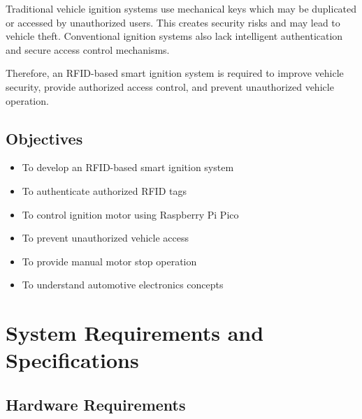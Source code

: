 \documentclass[12pt,a4paper,oneside]{report}
\begin{document}
Traditional vehicle ignition systems use mechanical keys which may be duplicated or accessed by unauthorized users. This creates security risks and may lead to vehicle theft. Conventional ignition systems also lack intelligent authentication and secure access control mechanisms.

Therefore, an RFID-based smart ignition system is required to improve vehicle security, provide authorized access control, and prevent unauthorized vehicle operation.

\section{Objectives}

\begin{itemize}

\item To develop an RFID-based smart ignition system

\item To authenticate authorized RFID tags

\item To control ignition motor using Raspberry Pi Pico

\item To prevent unauthorized vehicle access

\item To provide manual motor stop operation

\item To understand automotive electronics concepts

\end{itemize}


\chapter{System Requirements and Specifications}

\section{Hardware Requirements}
\end{document}
